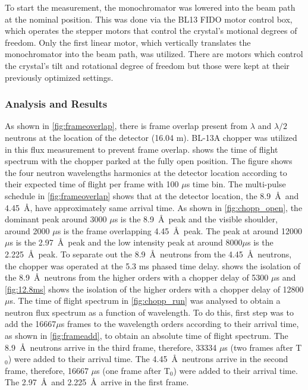 To start the measurement, the monochromator was lowered into the beam path at the nominal position. This was done via the BL13 FIDO motor control box, which operates the stepper motors that control the crystal's motional degrees of freedom. Only the first linear motor, which vertically translates the monochromator into the beam path, was utilized. There are motors which control the crystal's tilt and rotational degree of freedom but those were kept at their previously optimized settings.

\subsubsection{Analysis and Results}

As shown in \cref{fig:frameoverlap}, there is frame overlap present from $\lambda$ and $\lambda/2$ neutrons at the location of the detector (16.04 m). BL-13A chopper was utilized in this flux measurement to prevent frame overlap.  shows the time of flight spectrum with the chopper parked at the fully open position. The figure shows the four neutron wavelengths harmonics at the detector location according to their expected time of flight per frame with 100 $\mu$s time bin. The multi-pulse schedule in \cref{fig:frameoverlap} shows that at the detector location, the 8.9~\AA\ and 4.45~\AA, have approximately same arrival time. As shown in \cref{fig:chopp_open}, the dominant peak around 3000 $\mu$s is the 8.9~\AA\ peak and the visible shoulder, around 2000 $\mu$s is the frame overlapping 4.45~\AA\ peak. The peak at around 12000 $\mu$s is the 2.97~\AA\ peak and the low intensity peak at around 8000$\mu$s is the 2.225~\AA\ peak. To separate out the 8.9~\AA\ neutrons from the 4.45~\AA\ neutrons, the chopper was operated at the 5.3 ms phased time delay.  shows the isolation of the 8.9~\AA\ neutrons from the higher orders with a chopper delay of 5300 $\mu$s and \cref{fig:12.8ms} shows the isolation of the higher orders with a chopper delay of 12800 $\mu$s. The time of flight spectrum in \cref{fig:chopp_run} was analysed to obtain a neutron flux spectrum as a function of wavelength. To do this, first step was to add the 16667$\mu$s frames to the wavelength orders according to their arrival time, as shown in \cref{fig:frameadd}, to obtain an absolute time of flight spectrum. The 8.9~\AA\ neutrons arrive in the third frame, therefore, 33334 $\mu$s (two frames after T$_0$) were added to their arrival time. The 4.45~\AA\ neutrons arrive in the second frame, therefore, 16667 $\mu$s (one frame after T$_0$) were added to their arrival time. The 2.97~\AA\ and 2.225~\AA\ arrive in the first frame.

